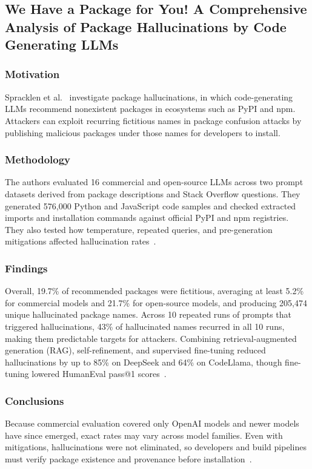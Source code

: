 \subsection{We Have a Package for You! A Comprehensive Analysis of Package Hallucinations by Code Generating LLMs}
\label{sec:package-hallucinations}

\subsubsection{Motivation}
Spracklen et al.~\cite{spracklen2025packages} investigate package hallucinations, in which code-generating LLMs recommend nonexistent packages in ecosystems such as PyPI and npm. Attackers can exploit recurring fictitious names in package confusion attacks by publishing malicious packages under those names for developers to install.

\subsubsection{Methodology}
The authors evaluated 16 commercial and open-source LLMs across two prompt datasets derived from package descriptions and Stack Overflow questions. They generated 576,000 Python and JavaScript code samples and checked extracted imports and installation commands against official PyPI and npm registries. They also tested how temperature, repeated queries, and pre-generation mitigations affected hallucination rates~\cite[Secs.~4--6]{spracklen2025packages}.

\subsubsection{Findings}
Overall, 19.7\% of recommended packages were fictitious, averaging at least 5.2\% for commercial models and 21.7\% for open-source models, and producing 205,474 unique hallucinated package names. Across 10 repeated runs of prompts that triggered hallucinations, 43\% of hallucinated names recurred in all 10 runs, making them predictable targets for attackers. Combining retrieval-augmented generation (RAG), self-refinement, and supervised fine-tuning reduced hallucinations by up to 85\% on DeepSeek and 64\% on CodeLlama, though fine-tuning lowered HumanEval pass@1 scores~\cite[Secs.~5--6]{spracklen2025packages}.

\subsubsection{Conclusions}
Because commercial evaluation covered only OpenAI models and newer models have since emerged, exact rates may vary across model families. Even with mitigations, hallucinations were not eliminated, so developers and build pipelines must verify package existence and provenance before installation~\cite[Secs.~6--7]{spracklen2025packages}.
